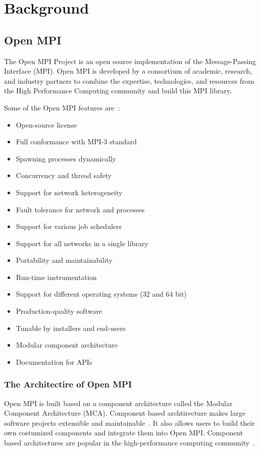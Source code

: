 \chapter{Background}
\label{sec:Background}

\section{Open MPI}
\label{sec:openmpi}
The Open MPI Project is an open source implementation of the Message-Passing Interface (MPI). Open MPI is developed by a consortium of academic, research, and industry partners to combine the expertise, technologies, and resources from the High Performance Computing community and build this MPI library.

Some of the Open MPI features are~\cite{openmpi}:
\begin{itemize}
  \item Open-source license
  \item Full conformance with MPI-3 standard
  \item Spawning processes dynamically
  \item Concurrency and thread safety
  \item Support for network heterogeneity
  \item Fault tolerance for network and processes
  \item Support for various job schedulers
  \item Support for all networks in a single library
  \item Portability and maintainability
  \item Run-time instrumentation
  \item Support for different operating systems (32 and 64 bit)
  \item Production-quality software
  \item Tunable by installers and end-users
  \item Modular component architecture
  \item Documentation for APIs
\end{itemize}
    
\subsection{The Architectire of Open MPI}
Open MPI is built based on a component architecture called the Modular Component Architecture (MCA). Component based archtirecture makes large software projects extensible and maintainable~\cite{barrett2005analysis,graham2006open}. It also allows users to build their own costumized components and integrate them into Open MPI. Component based architectures are popular in the high-performance computing community~\cite{squyres2003component,bernholdt2006component}.

